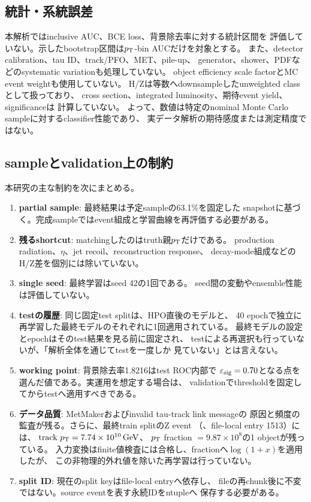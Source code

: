 \documentclass[xelatex,ja=standard,a4paper,10pt,twocolumn]{bxjsarticle}
\begin{document}
\subsection{統計・系統誤差}

本解析ではinclusive AUC、BCE loss、背景除去率に対する統計区間を
評価していない。示したbootstrap区間は\(p_{\mathrm{T}}\)-bin AUCだけを対象とする。
また、detector calibration、tau ID、track/PFO、MET、pile-up、
generator、shower、PDFなどのsystematic variationも処理していない。
object efficiency scale factorとMC event weightも使用していない。
H/Zは等数へdownsampleしたunweighted classとして扱っており、
cross section、integrated luminosity、期待event yield、significanceは
計算していない。
よって、数値は特定のnominal Monte Carlo sampleに対するclassifier性能であり、
実データ解析の期待感度または測定精度ではない。

\subsection{sampleとvalidation上の制約}

本研究の主な制約を次にまとめる。

\begin{enumerate}
  \item \textbf{partial sample}: 最終結果は予定sampleの63.1\%を固定した
    snapshotに基づく。完成sampleではevent組成と学習曲線を再評価する必要がある。
  \item \textbf{残るshortcut}: matchingしたのはtruth親\(p_{\mathrm{T}}\)だけである。
    production radiation、\(\eta\)、jet recoil、reconstruction response、
    decay-mode組成などのH/Z差を個別には除いていない。
  \item \textbf{single seed}: 最終学習はseed 42の1回である。
    seed間の変動やensemble性能は評価していない。
  \item \textbf{testの履歴}: 同じ固定test splitは、HPO直後のモデルと、
    40 epochで独立に再学習した最終モデルのそれぞれに1回適用されている。
    最終モデルの設定とepochはそのtest結果を見る前に固定され、
    testによる再選択も行っていないが、「解析全体を通じてtestを一度しか
    見ていない」とは言えない。
  \item \textbf{working point}: 背景除去率1.8216はtest ROC内部で
    \(\varepsilon_{\mathrm{sig}}=0.70\)となる点を選んだ値である。実運用を想定する場合は、
    validationでthresholdを固定してからtestへ適用すべきである。
  \item \textbf{データ品質}: MetMakerおよびinvalid tau-track link messageの
    原因と頻度の監査が残る。さらに、最終train splitのZ event
    （、file-local entry 1513）には、
    \(\mathrm{track}\ \pt=\SI{7.74e10}{\GeV}\)、
    \(p_{\mathrm{T}}\) fraction \(=9.87\times10^8\)の1 objectが残っている。
    入力変換はfinite値検査には合格し、fractionへ\(\log(1+x)\)を適用したが、
    この非物理的外れ値を除いた再学習は行っていない。
  \item \textbf{split ID}: 現在のsplit keyはfile-local entryへ依存し、
    fileの再chunk後に不変ではない。source eventを表す永続IDをntupleへ
    保存する必要がある。
\end{enumerate}
\end{document}
